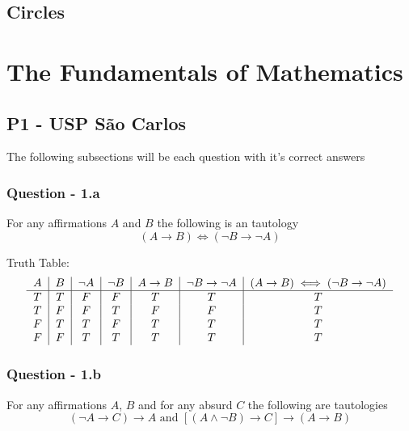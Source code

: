 \documentclass{article}
\begin{document}
    
    \subsection{Circles}
    \newpage

    \section{The Fundamentals of Mathematics}
    \subsection{P1 - USP São Carlos}
    The following subsections will be each question with it's correct answers
    \subsubsection{Question - 1.a}
    For any affirmations $A$ and $B$ the following is an tautology
    \begin{equation}
        (A\rightarrow B) \iff (\neg B \rightarrow\neg A)
    \end{equation}

    Truth Table:
    \begin{equation}
        \begin{tabular}{ c|c|c|c|c|c|c }
            $A$ & $B$ & $\neg A$ & $\neg B$ & $A \rightarrow B$ & $\neg B \rightarrow \neg A$ & $(A \rightarrow B) \iff (\neg B \rightarrow \neg A)$ \\
            \hline
            $T$ & $T$ & $F$ & $F$ & $T$ & $T$ & $T$ \\
            $T$ & $F$ & $F$ & $T$ & $F$ & $F$ & $T$ \\
            $F$ & $T$ & $T$ & $F$ & $T$ & $T$ & $T$ \\
            $F$ & $F$ & $T$ & $T$ & $T$ & $T$ & $T$ \\
        \end{tabular}
    \end{equation}

    \subsubsection{Question - 1.b}
    For any affirmations $A$, $B$ and for any absurd $C$ the following are tautologies 
    \begin{equation}
        (\neg A\rightarrow C) \rightarrow A \text{ and } [(A \wedge \neg B) \rightarrow C] \rightarrow (A \rightarrow B)
    \end{equation}
\end{document}
